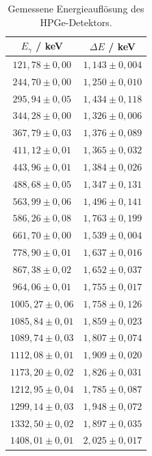 \begin{table}[H]
\centering
\caption{Gemessene Energieauflösung des HPGe-Detektors.}
\label{tab:fwhm_messwerte}
\begin{tabular}{cc}
\toprule
$E_\gamma$ / keV & $\Delta E$ / keV \\
\midrule
$121,78 \pm 0,00$   & $1,143 \pm 0,004$ \\
$244,70 \pm 0,00$   & $1,250 \pm 0,010$ \\
$295,94 \pm 0,05$   & $1,434 \pm 0,118$ \\
$344,28 \pm 0,00$   & $1,326 \pm 0,006$ \\
$367,79 \pm 0,03$   & $1,376 \pm 0,089$ \\
$411,12 \pm 0,01$   & $1,365 \pm 0,032$ \\
$443,96 \pm 0,01$   & $1,384 \pm 0,026$ \\
$488,68 \pm 0,05$   & $1,347 \pm 0,131$ \\
$563,99 \pm 0,06$   & $1,496 \pm 0,141$ \\
$586,26 \pm 0,08$   & $1,763 \pm 0,199$ \\
$661,70 \pm 0,00$   & $1,539 \pm 0,004$ \\
$778,90 \pm 0,01$   & $1,637 \pm 0,016$ \\
$867,38 \pm 0,02$   & $1,652 \pm 0,037$ \\
$964,06 \pm 0,01$   & $1,755 \pm 0,017$ \\
$1005,27 \pm 0,06$  & $1,758 \pm 0,126$ \\
$1085,84 \pm 0,01$  & $1,859 \pm 0,023$ \\
$1089,74 \pm 0,03$  & $1,807 \pm 0,074$ \\
$1112,08 \pm 0,01$  & $1,909 \pm 0,020$ \\
$1173,20 \pm 0,02$  & $1,826 \pm 0,031$ \\
$1212,95 \pm 0,04$  & $1,785 \pm 0,087$ \\
$1299,14 \pm 0,03$  & $1,948 \pm 0,072$ \\
$1332,50 \pm 0,02$  & $1,897 \pm 0,035$ \\
$1408,01 \pm 0,01$  & $2,025 \pm 0,017$ \\
\bottomrule
\end{tabular}
\end{table}


